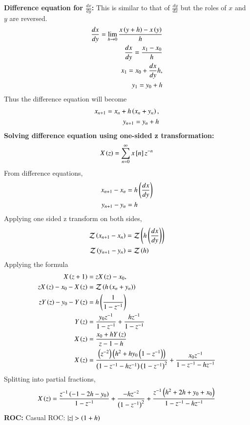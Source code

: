 \documentclass[journal]{IEEEtran}
\begin{document}
\textbf{Difference equation for $\frac{dx}{dy}$:}
This is similar to that of $\frac{dy}{dx}$ but the roles of $x$ and $y$ are reversed.
\begin{align}
\frac{dx}{dy}=\lim_{h \to 0} \frac{x\left(y+h\right)-x\left(y\right)}{h}\\
\frac{dx}{dy}=\frac{x_1-x_0}{h}\\
  x_1=x_0+\frac{dx}{dy}h,\\
  y_1=y_0+h
\end{align}
Thus the difference equation will become
\begin{align}
x_{n+1}=x_n+h\left(x_n+y_n\right),\\
y_{n+1}=y_n+h
\end{align}
\textbf{Solving difference equation using one-sided z transformation:}
\begin{align}
X\left(z\right)=\sum_{n=0}^{\infty} x{}\left[n\right]z^{-n}
\end{align}
From difference equations,
\begin{align}
x_{n+1}-x_n&=h\left(\frac{dx}{dy}\right)\\
y_{n+1}-y_n&=h
\end{align}
Applying one sided z transform on both sides,
\begin{align}
\mathcal{Z}\left(x_{n+1}-x_n\right)&=\mathcal{Z}\left(h\left(\frac{dx}{dy}\right)\right)\\
\mathcal{Z}\left(y_{n+1}-y_n\right)&=\mathcal{Z}\left(h\right)
\end{align}
Applying the formula
\begin{align}
X\left(z+1\right)&=zX\left(z\right)-x_0,\\
zX\left(z\right)-x_0-X\left(z\right)&=\mathcal{Z}\left(h\left(x_n+y_n\right)\right)\\
zY\left(z\right)-y_0-Y\left(z\right)&=h\left(\frac{1}{1-z^{-1}}\right)\\
Y\left(z\right)&=\frac{y_0z^{-1}}{1-z^{-1}}+\frac{hz^{-1}}{1-z^{-1}}\\
X\left(z\right)&=\frac{x_0+hY\left(z\right)}{z-1-h}\\
X\left(z\right)&=\frac{\left(z^{-2}\right)\left(h^2+hy_0\left(1-z^{-1}\right)\right)}{\left(1-z^{-1}-hz^{-1}\right)\left(1-z^{-1}\right)^2}+\frac{x_0z^{-1}}{1-z^{-1}-hz^{-1}}\\
\end{align}
Splitting into partial fractions,
\begin{align}
X\left(z\right)=\frac{z^{-1}\left(-1-2h-y_0\right)}{1-z^{-1}}+\frac{-hz^{-2}}{\left(1-z^{-1}\right)^2}+\frac{z^{-1}\left(h^2+2h+y_0+x_0\right)}{1-z^{-1}-hz^{-1}}
\end{align}
\textbf{ROC:}
Casual ROC: $\left\vert z\right\vert>\left(1+h\right)$\\
\end{document}
